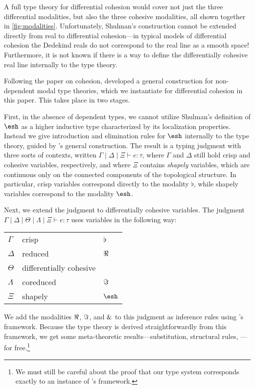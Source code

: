 \documentclass{article}
\begin{document}
A full type theory for differential cohesion would cover not just the three
differential modalities, but also the three cohesive modalities, all shown
together in \cref{fig:modalities}. Unfortunately, Shulman's construction cannot
be extended directly from real to differential cohesion---in typical models of
differential cohesion the Dedekind reals do not correspond to the real line as a
smooth space! Furthermore, it is not known if there is a way to define the
differentially cohesive real line internally to the type theory. 

Following the \citeyear{Licata2016} paper on cohesion, \citet{Licata2017}
developed a general construction for non-dependent modal type theories, which we
instantiate for differential cohesion in this paper. This takes place in two
stages.

First, in the absence of dependent types, we cannot utilize Shulman's definition
of $\shape$ as a higher inductive type characterized by its localization
properties. Instead we give introduction and elimination rules for $\shape$
internally to the type theory, guided by \citeauthor{Licata2017}'s general
construction. The result is a typing judgment with three sorts of contexts,
written $\Gamma \mid \Delta \mid \Xi \vdash e : \tau$, where $\Gamma$ and
$\Delta$ still hold crisp and cohesive variables, respectively, and where $\Xi$
contains \emph{shapely} variables, which are continuous only on the connected
components of the topological structure. In particular, crisp variables
correspond directly to the modality $\flat$, while shapely variables correspond
to the modality $\shape$.

Next, we extend the judgment to differentially cohesive variables. The judgment
$\Gamma \mid \Delta \mid \Theta \mid \Lambda \mid \Xi \vdash e : \tau$ uses
variables in the following way:
\begin{center} \begin{tabular}{lll}
    $\Gamma$ & crisp  &  $\flat$ \\
    $\Delta$ & reduced & $\Re$ \\
    $\Theta$ & differentially cohesive & \\
    $\Lambda$ & coreduced & $\Im$ \\
    $\Xi$ & shapely & $\shape$
\end{tabular} \end{center}
%
We add the modalities $\Re$, $\Im$, and $\&$ to this judgment as inference
rules using \citeauthor{Licata2017}'s framework. Because the type theory is
derived straightforwardly from this framework, we get some meta-theoretic
results---substitution, structural rules, \etc---for free.\footnote{We must
  still be careful about the proof that our type system corresponds exactly to
  an instance of \citeauthor{Licata2017}'s framework.} 
\end{document}
